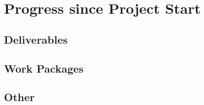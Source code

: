 \chapter{Progress since Project Start}
\label{chapter:progress}

\section{Deliverables}

\section{Work Packages}

\section{Other}


